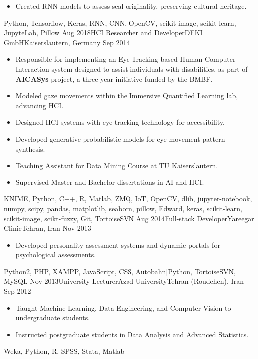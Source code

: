 \begin{experiences}
{\begin{itemize}
			\item Created RNN models to assess seal originality, preserving cultural heritage.
			

		\end{itemize}
	}
	{Python, Tensorflow, Keras, RNN, CNN, OpenCV, scikit-image, scikit-learn, JupyteLab, Pillow}
	\emptySeparator
	\experience
	{Aug 2018}{HCI Researcher and Developer}{DFKI GmbH}{Kaiserslautern, Germany}
	{Sep 2014} {
		\begin{itemize}
			\item Responsible for implementing an Eye-Tracking based Human-Computer Interaction system designed to assist individuals with disabilities, as part of \textbf{AICASys} project, a three-year initiative funded by the BMBF.
			\item Modeled gaze movements within the Immersive Quantified Learning lab, advancing HCI.
			
			\item Designed HCI systems with eye-tracking technology for accessibility.
			
			\item Developed generative probabilistic models for eye-movement pattern synthesis.
			
			\item Teaching Assistant for Data Mining Course at TU Kaiserslautern.
			
			\item Supervised Master and Bachelor dissertations in AI and HCI.
			

		\end{itemize}
	}
	{KNIME, Python, C++, R, Matlab, ZMQ, IoT, OpenCV, dlib, jupyter-notebook, numpy, scipy, pandas, matplotlib, seaborn, pillow, Edward, keras, scikit-learn, scikit-image, scikt-fuzzy, Git, TortoiseSVN}
	\emptySeparator
	\experience
	{Aug 2014}{Full-stack Developer}{Yareegar Clinic}{Tehran, Iran}
	{Nov 2013} {
		\begin{itemize}
			\item Developed personality assessment systems and dynamic portals for psychological assessments.
			
		\end{itemize}
	}
	{Python2, PHP, XAMPP, JavaScript, CSS, Autobahn|Python, TortoiseSVN, MySQL}
	\emptySeparator
	\experience
	{Nov 2013}{University Lecturer}{Azad University}{Tehran (Roudehen), Iran}
	{Sep 2012} {
		\begin{itemize}
			\item Taught Machine Learning, Data Engineering, and Computer Vision to undergraduate students.

			\item Instructed postgraduate students in Data Analysis and Advanced Statistics.
			

		\end{itemize}
	}
	{Weka, Python, R, SPSS, Stata, Matlab}
\end{experiences}
